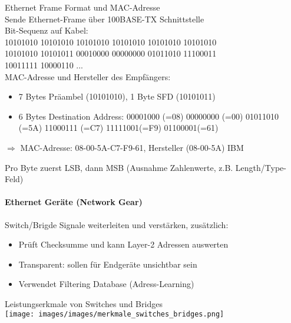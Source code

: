\begin{example2}{Ethernet Frame Format und MAC-Adresse}\\
    Sende Ethernet-Frame über 100BASE-TX Schnittstelle\\ Bit-Sequenz auf Kabel:\\
    10101010 10101010 10101010 10101010 10101010 10101010\\
    10101010 10101011 00010000 00000000 01011010 11100011\\
    10011111 10000110 ...\\
    MAC-Adresse und Hersteller des Empfängers:
    \begin{itemize}
        \item 7 Bytes Präambel (10101010), 1 Byte SFD (10101011)
        \item 6 Bytes Destination Address: 00001000 (=08) 00000000 (=00) 01011010 (=5A) 11000111 (=C7) 11111001(=F9) 01100001(=61)
    \end{itemize}
    $\Rightarrow$ MAC-Adresse: 08-00-5A-C7-F9-61, Hersteller (08-00-5A) IBM
\end{example2}

\begin{remark}
    Pro Byte zuerst LSB, dann MSB (Ausnahme Zahlenwerte, z.B. Length/Type-Feld)
\end{remark}

\paragraph{Ethernet Geräte (Network Gear)}

\begin{definition}{Switch/Brigde} Signale weiterleiten und verstärken, zusätzlich:
    \begin{itemize}
        \item Prüft Checksumme und kann Layer-2 Adressen auswerten
        \item Transparent: sollen für Endgeräte unsichtbar sein
        \item Verwendet Filtering Database (Adress-Learning)
    \end{itemize}
\end{definition}

\begin{theorem}{Leistungserkmale von Switches und Bridges}\\
    \texttt{[image: images/images/merkmale\_switches\_bridges.png]}
\end{theorem}


